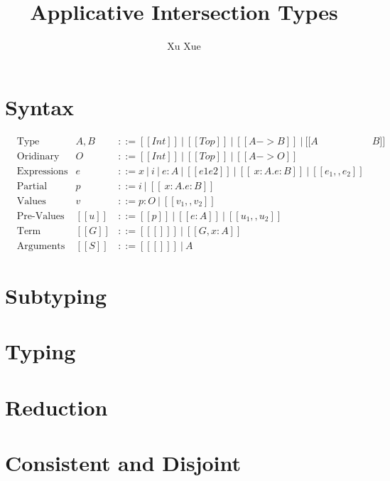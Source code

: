 \documentclass[a4paper]{article}
\title{Applicative Intersection Types}
\author{Xu Xue}
\begin{document}
\maketitle

\section{Syntax}

\begin{align*}
  &\text{Type} &A, B&::= [[Int]] ~|~ [[Top]] ~|~ [[A-> B]] ~|~ [[A&B]]\\
  &\text{Oridinary Type} &O&::= [[Int]] ~|~ [[Top]] ~|~ [[A-> O]]\\
  &\text{Expressions} &e    &::= x ~|~ i ~|~ e:A ~|~ [[e1 e2]] ~|~ [[ \ x : A .e : B]]~|~ [[e_1,,e_2]] \\
  &\text{Partial Values} &p   &::= i~|~ [[ \ x : A .e : B]] \\
  &\text{Values} &v   &::= p:O ~|~ [[v_1,,v_2]] \\
  &\text{Pre-Values} &[[u]] &::= [[p]] ~|~[[e:A]]~|~ [[u_1,,u_2]]\\
  &\text{Term contexts} &[[G]] &::=  [[ [] ]] ~|~ [[ G, x:A ]] \\
  &\text{Arguments} &[[S]] &::= [[ [] ]] ~|~ A
\end{align*}

\section{Subtyping}

\ottdefnsTopLikeType

\ottdefnsOrdinaryType

\ottdefnsSplitType

\ottdefnsSubSubtyping

\ottdefnsAlgorithmicSubtyping

\ottdefnsAppsubBinary

\ottdefnsAppsub

\section{Typing}

\ottdefnsTyping

\section{Reduction}

\ottdefnsTypedReduction

\ottdefnsParallelApplication

\ottdefnsReduction

\section{Consistent and Disjoint}

\ottdefnsPrincipalType

\ottdefnsConsistent

\ottdefnsDisjoint
\end{document}
